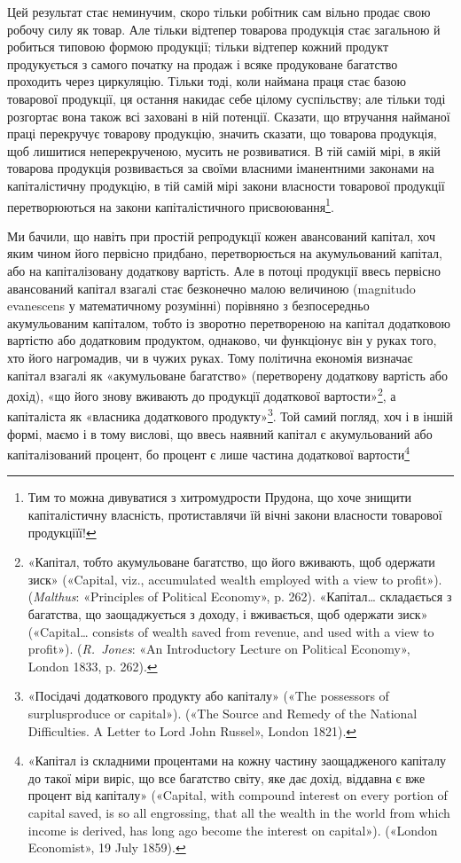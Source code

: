 
Цей результат стає неминучим, скоро тільки робітник сам
вільно продає свою робочу силу як товар. Але тільки відтепер товарова
продукція стає загальною й робиться типовою формою продукції;
тільки відтепер кожний продукт продукується з самого
початку на продаж і всяке продуковане багатство проходить через
циркуляцію. Тільки тоді, коли наймана праця стає базою товарової
продукції, ця остання накидає себе цілому суспільству;
але тільки тоді розгортає вона також всі заховані в ній потенції.
Сказати, що втручання найманої праці перекручує товарову
продукцію, значить сказати, що товарова продукція, щоб лишитися
неперекрученою, мусить не розвиватися. В тій самій мірі,
в якій товарова продукція розвивається за своїми власними
іманентними законами на капіталістичну продукцію, в тій самій
мірі закони власности товарової продукції перетворюються на
закони капіталістичного присвоювання\footnote{
Тим то можна дивуватися з хитромудрости Прудона, що хоче знищити
капіталістичну власність, протиставлячи їй вічні закони власности
товарової продукціїї!
}.

\label{original-499}Ми бачили, що навіть при простій репродукції кожен авансований
капітал, хоч яким чином його первісно придбано, перетворюється
на акумульований капітал, або на капіталізовану
додаткову вартість. Але в потоці продукції ввесь первісно авансований
капітал взагалі стає безконечно малою величиною (magnitudo
evanescens у математичному розумінні) порівняно з безпосередньо
акумульованим капіталом, тобто із зворотно перетвореною
на капітал додатковою вартістю або додатковим продуктом,
однаково, чи функціонує він у руках того, хто його нагромадив,
чи в чужих руках. Тому політична економія визначає капітал
взагалі як «акумульоване багатство» (перетворену додаткову
вартість або дохід), «що його знову вживають до продукції додаткової
вартости»\footnote{
«Капітал, тобто акумульоване багатство, що його вживають, щоб
одержати зиск» («Capital, viz., accumulated wealth employed with a
view to profit»). (\emph{Malthus}: «Principles of Political Economy», p. 262).
«Капітал\dots{} складається з багатства, що заощаджується з доходу, і вживається,
щоб одержати зиск» («Capital\dots{} consists of wealth saved from
revenue, and used with a view to profit»). (\emph{R.~Jones}: «An Introductory
Lecture on Political Economy», London 1833, p. 262).
}, а капіталіста як «власника додаткового
продукту»\footnote{
«Посідачі додаткового продукту або капіталу» («The possessors
of surplusproduce or capital»). («The Source and Remedy of the National
Difficulties. A Letter to Lord John Russel», London 1821).
}. Той самий погляд, хоч і в іншій формі, маємо і
в тому вислові, що ввесь наявний капітал є акумульований або
капіталізований процент, бо процент є лише частина додаткової
вартости\footnote{
«Капітал із складними процентами на кожну частину заощадженого
капіталу до такої міри виріс, що все багатство світу, яке дає дохід,
віддавна є вже процент від капіталу» («Capital, with compound interest
on every portion of capital saved, is so all engrossing, that all the wealth
in the world from which income is derived, has long ago become the
interest on capital»). («London Economist», 19 July 1859).
}
